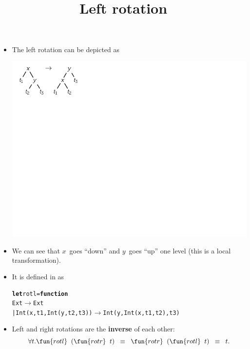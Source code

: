 \documentclass[wide]{slides}
\begin{document}
\begin{slide}
  \title{Left rotation}

  \begin{itemize}

    \item The left rotation can be depicted as
      \begin{center}
        \includegraphics[trim=5mm 73mm 7cm 0]{rotl.pdf}
      \end{center}

    \item We can see that \(x\)~goes ``down'' and \(y\)~goes ``up''
      one level (this is a local transformation).

    \item It is defined in \OCaml as
      \smallskip
\begin{alltt}
\textbf{let} rotl = \textbf{function}
  Ext \(\rightarrow\) Ext
| Int (x, t1, Int(y,t2,t3)) \(\rightarrow\) Int (y, Int(x,t1,t2), t3)
\end{alltt}


  \item Left and right rotations are the \textbf{inverse} of each other:
    \begin{equation*}
      \forall t. \fun{rotl} \;\; (\fun{rotr} \;\; t) \;\; \equiv \;\;
      \fun{rotr} \;\; (\fun{rotl} \;\; t) \;\; \equiv \;\;t.
    \end{equation*}

  \end{itemize}

\end{slide}
\end{document}

